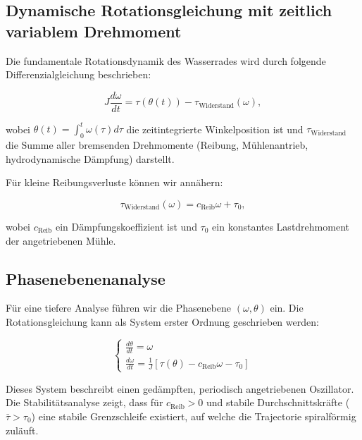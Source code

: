 \documentclass[a4paper,12pt]{article}
\theoremstyle{definition}
\begin{document}
\subsection{Dynamische Rotationsgleichung mit zeitlich variablem Drehmoment}

Die fundamentale Rotationsdynamik des Wasserrades wird durch folgende Differenzialgleichung beschrieben:

\begin{equation}
  J \frac{d\omega}{dt} = \tau(\theta(t)) - \tau_\text{Widerstand}(\omega),
  \label{eq:rot_dgl}
\end{equation}

\noindent
wobei $\theta(t) = \int_0^t \omega(\tau) d\tau$ die zeitintegrierte Winkelposition ist und $\tau_\text{Widerstand}$ die Summe aller bremsenden Drehmomente (Reibung, Mühlenantrieb, hydrodynamische Dämpfung) darstellt.

Für kleine Reibungsverluste können wir annähern:

\begin{equation}
  \tau_\text{Widerstand}(\omega) = c_\text{Reib} \omega + \tau_0,
  \label{eq:widerstand_linear}
\end{equation}

\noindent
wobei $c_\text{Reib}$ ein Dämpfungskoeffizient ist und $\tau_0$ ein konstantes Lastdrehmoment der angetriebenen Mühle.

\subsection{Phasenebenenanalyse}

Für eine tiefere Analyse führen wir die Phasenebene $(\omega, \theta)$ ein. Die Rotationsgleichung kann als System erster Ordnung geschrieben werden:

\begin{equation}
  \begin{cases}
    \frac{d\theta}{dt} = \omega \\
    \frac{d\omega}{dt} = \frac{1}{J}[\tau(\theta) - c_\text{Reib}\omega - \tau_0]
  \end{cases}
  \label{eq:phasen_system}
\end{equation}

Dieses System beschreibt einen gedämpften, periodisch angetriebenen Oszillator. Die Stabilitätsanalyse zeigt, dass für $c_\text{Reib} > 0$ und stabile Durchschnittskräfte ($\bar{\tau} > \tau_0$) eine stabile Grenzschleife existiert, auf welche die Trajectorie spiralförmig zuläuft.
\end{document}
